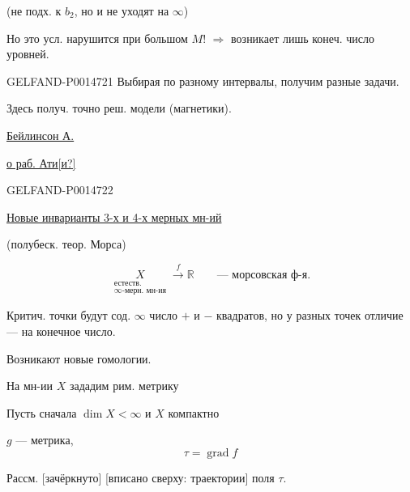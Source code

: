 (не подх. к \(b_2\), но и не уходят на \(\infty\))

Но это усл. нарушится при большом \(M\)!
\(\Longrightarrow\) возникает лишь конеч. число уровней.


\begin{GelfandAdjacentEvidence}{GELFAND-P001472}{1}
Выбирая по разному интервалы, получим разные задачи.

Здесь получ. точно реш. модели (магнетики).

\underline{\underline{Бейлинсон А.}}

\underline{о раб. Ати[и?]}
\end{GelfandAdjacentEvidence}
\begin{GelfandAdjacentEvidence}{GELFAND-P001472}{2}


\underline{Новые инварианты 3-х и 4-х мерных мн-ий}

(полубеск. теор. Морса)

\[
\underset{\substack{\text{естеств.}\\\infty\text{-мерн. мн-ия}}}{X}
\xrightarrow{f}\mathbb R\qquad\text{— морсовская ф-я.}
\]

Критич. точки будут сод. \(\infty\) число \(+\) и \(-\) квадратов, но у разных точек отличие — на конечное число.

Возникают новые гомологии.

На мн-ии \(X\) зададим рим. метрику

Пусть сначала \(\dim X<\infty\) и \(X\) компактно

\(g\) — метрика,
\[
\tau=\operatorname{grad}f
\]

Рассм. [зачёркнуто] [вписано сверху: траектории] поля \(\tau\).
\end{GelfandAdjacentEvidence}
